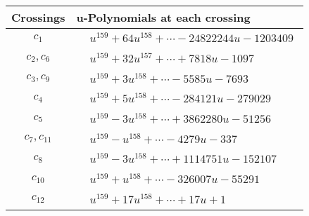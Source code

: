 \documentclass[1p]{elsarticle_modified}
\theoremstyle{definition}
\begin{document}
\begin{tabular}{m{50pt}|m{274pt}}
Crossings & \hspace{64pt}u-Polynomials at each crossing \\
\hline $$\begin{aligned}c_{1}\end{aligned}$$&$\begin{aligned}
&u^{159}+64 u^{158}+\cdots-24822244 u-1203409
\end{aligned}$\\
\hline $$\begin{aligned}c_{2},c_{6}\end{aligned}$$&$\begin{aligned}
&u^{159}+32 u^{157}+\cdots+7818 u-1097
\end{aligned}$\\
\hline $$\begin{aligned}c_{3},c_{9}\end{aligned}$$&$\begin{aligned}
&u^{159}+3 u^{158}+\cdots-5585 u-7693
\end{aligned}$\\
\hline $$\begin{aligned}c_{4}\end{aligned}$$&$\begin{aligned}
&u^{159}+5 u^{158}+\cdots-284121 u-279029
\end{aligned}$\\
\hline $$\begin{aligned}c_{5}\end{aligned}$$&$\begin{aligned}
&u^{159}-3 u^{158}+\cdots+3862280 u-51256
\end{aligned}$\\
\hline $$\begin{aligned}c_{7},c_{11}\end{aligned}$$&$\begin{aligned}
&u^{159}- u^{158}+\cdots-4279 u-337
\end{aligned}$\\
\hline $$\begin{aligned}c_{8}\end{aligned}$$&$\begin{aligned}
&u^{159}-3 u^{158}+\cdots+1114751 u-152107
\end{aligned}$\\
\hline $$\begin{aligned}c_{10}\end{aligned}$$&$\begin{aligned}
&u^{159}+u^{158}+\cdots-326007 u-55291
\end{aligned}$\\
\hline $$\begin{aligned}c_{12}\end{aligned}$$&$\begin{aligned}
&u^{159}+17 u^{158}+\cdots+17 u+1
\end{aligned}$\\
\hline
\end{tabular}\\~\\
\end{document}
